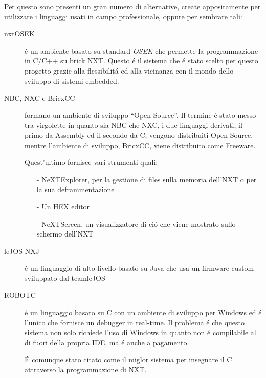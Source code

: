 Per questo sono presenti un gran numero di alternative, create
appositamente per utilizzare i linguaggi usati in campo professionale,
oppure per sembrare tali:
\begin{description}
    \item[nxtOSEK]\'e un ambiente basato su standard \emph{OSEK} che
        permette la programmazione in C/C++ su brick NXT. Questo \'e il
        sistema che \'e stato scelto per questo progetto grazie alla
        flessibilit\'a ed alla vicinanza con il mondo dello sviluppo di
        sistemi embedded.
    \item[NBC, NXC e BricxCC]formano un ambiente di sviluppo ``Open
        Source''. Il termine \'e stato messo tra virgolette in quanto sia
        NBC che NXC, i due linguaggi derivati, il primo da Assembly ed il
        secondo da C, vengono distribuiti Open Source, mentre l'ambiente di
        sviluppo, BricxCC, viene distribuito come Freeware.

        Quest'ultimo fornisce vari strumenti quali:
        \begin{itemize}
            \item[-]NeXTExplorer, per la gestione di files sulla memoria
                dell'NXT o per la sua deframmentazione
            \item[-]Un HEX editor
            \item[-]NeXTScreen, un visualizzatore di ci\'o che viene
                mostrato sullo schermo dell'NXT
        \end{itemize}
    \item[leJOS NXJ]\cite{bib:lejos}\'e un linguaggio di alto livello basato su Java che
        usa un firmware custom sviluppato dal teamleJOS
    \item[ROBOTC]\cite{bib:robotc}\'e un linguaggio basato su C con un ambiente di sviluppo
        per Windows ed \'e l'unico che fornisce un debugger in real-time.
        Il problema \'e che questo sistema non solo richiede l'uso di
        Windows in quanto non \'e compilabile al di fuori della propria
        IDE, ma \'e anche a pagamento.

        \'E comunque stato citato come il miglor sistema per insegnare il C
        attraverso la programmazione di NXT\cite{bib:rcarticle}.
\end{description}



\cleardoublepage
